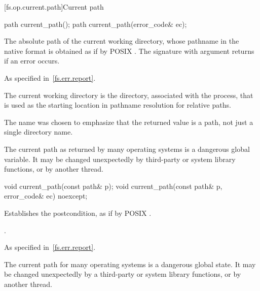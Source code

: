 [fs.op.current.path]{Current path}

%
\begin{itemdecl}
path current_path();
path current_path(error_code& ec);
\end{itemdecl}

\begin{itemdescr}
\pnum
\returns
The absolute path of the current working directory,
  whose pathname in the native format is
  obtained as if by POSIX .
  The signature with argument  returns  if an
  error occurs.

\pnum
\throws
As specified in~\ref{fs.err.report}.

\pnum
\remarks
The current working directory is the directory, associated
  with the process, that is used as the starting location in pathname resolution
  for relative paths.

\pnum
\begin{note}
The  name was chosen to emphasize that the returned value is a
  path, not just a single directory name.
\end{note}

\pnum
\begin{note}
The current path as returned by many operating systems is a dangerous
  global variable. It may be changed unexpectedly by third-party or system
  library functions, or by another thread.
\end{note}
\end{itemdescr}

%
\begin{itemdecl}
void current_path(const path& p);
void current_path(const path& p, error_code& ec) noexcept;
\end{itemdecl}

\begin{itemdescr}
\pnum
\effects
Establishes the postcondition, as if by POSIX .

\pnum
\ensures
{}.

\pnum
\throws
As specified in~\ref{fs.err.report}.

\pnum
\begin{note}
The current path for many operating systems is a dangerous
  global state. It may be changed unexpectedly by a third-party or system
  library functions, or by another thread.
\end{note}
\end{itemdescr}

